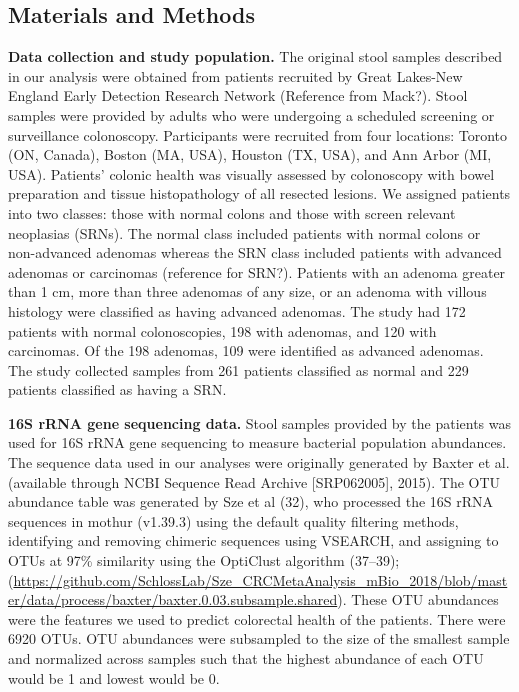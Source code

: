 \documentclass[11pt,]{article}
\begin{document}
\subsection{Materials and Methods}\label{materials-and-methods}

\textbf{Data collection and study population.} The original stool
samples described in our analysis were obtained from patients recruited
by Great Lakes-New England Early Detection Research Network (Reference
from Mack?). Stool samples were provided by adults who were undergoing a
scheduled screening or surveillance colonoscopy. Participants were
recruited from four locations: Toronto (ON, Canada), Boston (MA, USA),
Houston (TX, USA), and Ann Arbor (MI, USA). Patients' colonic health was
visually assessed by colonoscopy with bowel preparation and tissue
histopathology of all resected lesions. We assigned patients into two
classes: those with normal colons and those with screen relevant
neoplasias (SRNs). The normal class included patients with normal colons
or non-advanced adenomas whereas the SRN class included patients with
advanced adenomas or carcinomas (reference for SRN?). Patients with an
adenoma greater than 1 cm, more than three adenomas of any size, or an
adenoma with villous histology were classified as having advanced
adenomas. The study had 172 patients with normal colonoscopies, 198 with
adenomas, and 120 with carcinomas. Of the 198 adenomas, 109 were
identified as advanced adenomas. The study collected samples from 261
patients classified as normal and 229 patients classified as having a
SRN.

\textbf{16S rRNA gene sequencing data.} Stool samples provided by the
patients was used for 16S rRNA gene sequencing to measure bacterial
population abundances. The sequence data used in our analyses were
originally generated by Baxter et al. (available through NCBI Sequence
Read Archive {[}SRP062005{]}, 2015). The OTU abundance table was
generated by Sze et al (32), who processed the 16S rRNA sequences in
mothur (v1.39.3) using the default quality filtering methods,
identifying and removing chimeric sequences using VSEARCH, and assigning
to OTUs at 97\% similarity using the OptiClust algorithm (37--39);
(\url{https://github.com/SchlossLab/Sze_CRCMetaAnalysis_mBio_2018/blob/master/data/process/baxter/baxter.0.03.subsample.shared}).
These OTU abundances were the features we used to predict colorectal
health of the patients. There were 6920 OTUs. OTU abundances were
subsampled to the size of the smallest sample and normalized across
samples such that the highest abundance of each OTU would be 1 and
lowest would be 0.
\end{document}
